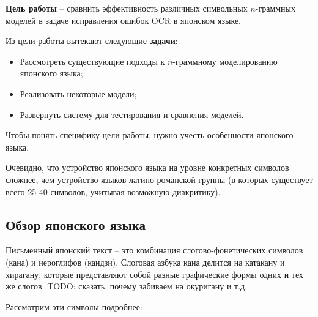 \documentclass[14pt,russian]{extreport}
\theoremstyle{definition}
\newcommand{\todo}[1]{}
\renewcommand{\todo}[1]{{\color{red} TODO: {#1}}}
\begin{document}
\textbf{Цель работы} -- сравнить эффективность различных символьных $n$-граммных моделей в задаче исправления ошибок OCR в японском языке.

Из цели работы вытекают следующие \textbf{задачи}:
\begin{itemize}
	\item Рассмотреть существующие подходы к $n$-граммному моделированию японского языка;
	
	\item Реализовать некоторые модели;
	
	\item Развернуть систему для тестирования и сравнения моделей.
\end{itemize}

Чтобы понять специфику цели работы, нужно учесть особенности японского языка.

Очевидно, что устройство японского языка на уровне конкретных символов сложнее, чем устройство языков латино-романской группы (в которых существует всего 25-40 символов, учитывая возможную диакритику).

\subsection{ Обзор японского языка }

Письменный японский текст -- это комбинация слогово-фонетических символов (кана) и иероглифов (кандзи).
Слоговая азбука кана делится на катакану и хирагану, которые представляют собой разные графические формы одних и тех же слогов. \todo{сказать, почему забиваем на окуригану и т.д.}

Рассмотрим эти символы подробнее:
\end{document}
